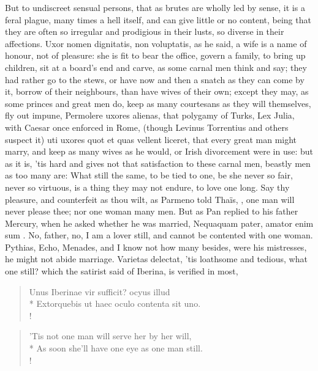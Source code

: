 But to undiscreet sensual persons, that as brutes are wholly led by
sense, it is a feral plague, many times a hell itself, and can give
little or no content, being that they are often so irregular and
prodigious in their lusts, so diverse in their affections. Uxor nomen
dignitatis, non voluptatis, as he said, a wife is a name of
honour, not of pleasure: she is fit to bear the office, govern a
family, to bring up children, sit at a board's end and carve, as some
carnal men think and say; they had rather go to the stews, or have now
and then a snatch as they can come by it, borrow of their neighbours,
than have wives of their own; except they may, as some princes and
great men do, keep as many courtesans as they will themselves, fly out
impune, Permolere uxores alienas, that polygamy of Turks, Lex
Julia, with Caesar once enforced in Rome, (though Levinus Torrentius
and others suspect it) uti uxores quot et quas vellent liceret, that
every great man might marry, and keep as many wives as he would, or
Irish divorcement were in use: but as it is, 'tis hard and gives not
that satisfaction to these carnal men, beastly men as too many are:
What still the same, to be tied to one, be she never so
fair, never so virtuous, is a thing they may not endure, to love one
long. Say thy pleasure, and counterfeit as thou wilt, as Parmeno
told Thaïs, , one man will never please thee;
nor one woman many men. But as Pan replied to his father Mercury,
when he asked whether he was married, Nequaquam pater, amator enim sum
\etc{}. No, father, no, I am a lover still, and cannot be contented with
one woman. Pythias, Echo, Menades, and I know not how many besides,
were his mistresses, he might not abide marriage. Varietas delectat,
'tis loathsome and tedious, what one still? which the satirist said of
Iberina, is verified in most,
%
\begin{latin}%
\begin{verse}%
Unus Iberinae vir sufficit? ocyus illud\\*
Extorquebis ut haec oculo contenta sit uno.\\!
\end{verse}%
\end{latin}%
\translationrule%
\begin{verse}
'Tis not one man will serve her by her will,\\*
As soon she'll have one eye as one man still.\\!
\end{verse}
%

